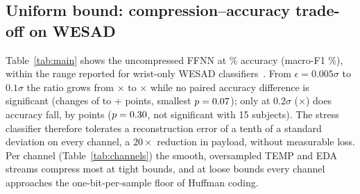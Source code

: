 \documentclass[journal]{IEEEtran}
\begin{document}
\subsection{Uniform bound: compression--accuracy trade-off on WESAD}
\begin{table}[t]
\caption{WESAD, uniform bound: ratio and LOSO accuracy of the proposed codec (matched; mean $\pm$ 95\% CI over 15 subjects; $p$: Wilcoxon vs.\ uncompressed).}
\label{tab:main}
\centering\scriptsize
\resizebox{\columnwidth}{!}{}
\end{table}
\begin{table}[t]
\caption{WESAD baselines. Top: error-bounded methods at each uniform $\epsilon$ (ratio, accuracy change in points, realized worst-case error for ZFP). Bottom: methods without a tunable bound (ratio, matched $\Delta$Acc., mismatched accuracy).}
\label{tab:baselines}
\centering\scriptsize
\resizebox{\columnwidth}{!}{}
\end{table}
\begin{table}[t]
\caption{WESAD: per-channel ratio at each uniform bound and worst-case $\max|\hat{x}-x|/\epsilon$ over all subjects and samples.}
\label{tab:channels}
\centering\scriptsize
\resizebox{\columnwidth}{!}{}
\end{table}

Table~\ref{tab:main} shows the uncompressed FFNN at \rawAcc\% accuracy (macro-F1 \rawF\%), within the range reported for wrist-only WESAD classifiers~\cite{sipele2023}. From $\epsilon=0.005\sigma$ to $0.1\sigma$ the ratio grows from \ratioEa$\times$ to \ratioEe$\times$ while no paired accuracy difference is significant (changes of \dAccEa{} to +\dAccEe{} points, smallest $p=0.07$); only at $0.2\sigma$ (\ratioEf$\times$) does accuracy fall, by \dAccEf{} points ($p=0.30$, not significant with 15 subjects). The stress classifier therefore tolerates a reconstruction error of a tenth of a standard deviation on every channel, a $20\times$ reduction in payload, without measurable loss. Per channel (Table~\ref{tab:channels}) the smooth, oversampled TEMP and EDA streams compress most at tight bounds, and at loose bounds every channel approaches the one-bit-per-sample floor of Huffman coding.
\end{document}
